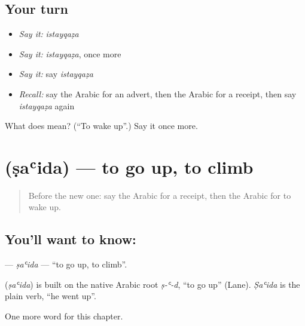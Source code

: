 \subsection*{Your turn}
\begin{itemize}
\raggedright
  \item \emph{Say it:} \emph{istayqaẓa}
  \item \emph{Say it:} \emph{istayqaẓa}, once more
  \item \emph{Say it:} say \emph{istayqaẓa}
  \item \emph{Recall:} say the Arabic for an advert, then the Arabic for a receipt, then say \emph{istayqaẓa} again
\end{itemize}

\begin{tcolorbox}[breakable,colback=teal!4,colframe=teal!35!black,title={Before you move on}]
What does  mean? (\textquotedblleft{}To wake up\textquotedblright{}.) Say it once more.
\end{tcolorbox}
\section[\texorpdfstring{\ar{صعد} (ṣaʿida)}{صعد (ṣaʿida)}]{ (ṣaʿida) — to go up, to climb}

\label{lesson:AR-C159-saida}



\begin{quote}
Before the new one: say the Arabic for a receipt, then the Arabic for to wake up.
\end{quote}

\subsection*{You'll want to know: }
\textbf{} — \emph{ṣaʿida} — \textquotedblleft{}to go up, to climb\textquotedblright{}.

\begin{cousinweb}
\textbf{} (\emph{ṣaʿida}) is built on the native Arabic root \emph{ṣ-ʿ-d}, \textquotedblleft{}to go up\textquotedblright{} (Lane). \emph{Ṣaʿida} is the plain verb, \textquotedblleft{}he went up\textquotedblright{}.
\end{cousinweb}

\begin{grammarlens}[title={What you've built}]
One more word for this chapter.
\end{grammarlens}

